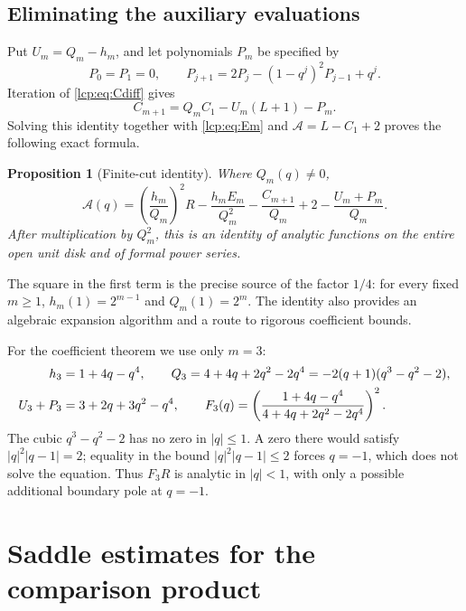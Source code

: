 \documentclass[11pt]{article}
\numberwithin{equation}{section}
\newtheorem{proposition}[theorem]{Proposition}
\theoremstyle{definition}\newtheorem{definition}[theorem]{Definition}
\theoremstyle{remark}\newtheorem{remark}[theorem]{Remark}
\newcommand{\Acal}{\mathcal A}
\begin{document}
\subsection{Eliminating the auxiliary evaluations}
Put $U_m=Q_m-h_m$, and let polynomials $P_m$ be specified by
\[
 P_0=P_1=0,\qquad
 P_{j+1}=2P_j-(1-q^j)^2P_{j-1}+q^j.
\]
Iteration of \eqref{lcp:eq:Cdiff} gives
\[
 C_{m+1}=Q_mC_1-U_m(L+1)-P_m.
\]
Solving this identity together with \eqref{lcp:eq:Em} and
$\Acal=L-C_1+2$ proves the following exact formula.

\begin{proposition}[Finite-cut identity]\label{lcp:prop:cut}
Where $Q_m(q)\ne0$,
\begin{equation}\label{lcp:eq:cut}
 \Acal(q)=\left(\frac{h_m}{Q_m}\right)^2R
 -\frac{h_mE_m}{Q_m^2}-\frac{C_{m+1}}{Q_m}
 +2-\frac{U_m+P_m}{Q_m}.
\end{equation}
After multiplication by $Q_m^2$, this is an identity of analytic
functions on the entire open unit disk and of formal power series.
\end{proposition}

The square in the first term is the precise source of the factor $1/4$:
for every fixed $m\ge1$, $h_m(1)=2^{m-1}$ and $Q_m(1)=2^m$.
The identity also provides an algebraic expansion algorithm and a
route to rigorous coefficient bounds.

For the coefficient theorem we use only $m=3$:
\begin{align}\label{lcp:eq:thirdcut}
 h_3&=1+4q-q^4,\qquad
 Q_3=4+4q+2q^2-2q^4
      =-2(q+1)(q^3-q^2-2),\notag\\
 U_3+P_3&=3+2q+3q^2-q^4,\qquad
 F_3(q)=\left(\frac{1+4q-q^4}{4+4q+2q^2-2q^4}\right)^2.
\end{align}
The cubic $q^3-q^2-2$ has no zero in $|q|\le1$.
A zero there would satisfy $|q|^2|q-1|=2$; equality in the bound
$|q|^2|q-1|\le2$ forces $q=-1$, which does not solve the equation.
Thus $F_3R$ is analytic in $|q|<1$, with only a possible additional
boundary pole at $q=-1$.

\section{Saddle estimates for the comparison product}\label{lcp:sec:saddle}
\end{document}
